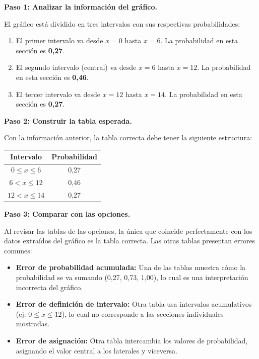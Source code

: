 \documentclass[
]{article}
\providecommand{\tightlist}{%
  \setlength{\itemsep}{0pt}\setlength{\parskip}{0pt}}
\begin{document}
\textbf{Paso 1: Analizar la información del gráfico.}

El gráfico está dividido en tres intervalos con sus respectivas
probabilidades:

\begin{enumerate}
\def\labelenumi{\arabic{enumi}.}
\tightlist
\item
  El primer intervalo va desde \(x=0\) hasta \(x=6\). La probabilidad en
  esta sección es \textbf{0,27}.
\item
  El segundo intervalo (central) va desde \(x=6\) hasta \(x=12\). La
  probabilidad en esta sección es \textbf{0,46}.
\item
  El tercer intervalo va desde \(x=12\) hasta \(x=14\). La probabilidad
  en esta sección es \textbf{0,27}.
\end{enumerate}

\textbf{Paso 2: Construir la tabla esperada.}

Con la información anterior, la tabla correcta debe tener la siguiente
estructura:

\begin{longtable}[]{@{}cc@{}}
\toprule\noalign{}
Intervalo & Probabilidad \\
\midrule\noalign{}
\endhead
\bottomrule\noalign{}
\endlastfoot
\(0 \le x \le 6\) & 0,27 \\
\(6 < x \le 12\) & 0,46 \\
\(12 < x \le 14\) & 0,27 \\
\end{longtable}

\textbf{Paso 3: Comparar con las opciones.}

Al revisar las tablas de las opciones, la única que coincide
perfectamente con los datos extraídos del gráfico es la tabla correcta.
Las otras tablas presentan errores comunes:

\begin{itemize}
\tightlist
\item
  \textbf{Error de probabilidad acumulada:} Una de las tablas muestra
  cómo la probabilidad se va sumando (0,27, 0,73, 1,00), lo cual es una
  interpretación incorrecta del gráfico.
\item
  \textbf{Error de definición de intervalo:} Otra tabla usa intervalos
  acumulativos (ej: \(0 \le x \le 12\)), lo cual no corresponde a las
  secciones individuales mostradas.
\item
  \textbf{Error de asignación:} Otra tabla intercambia los valores de
  probabilidad, asignando el valor central a los laterales y viceversa.
\end{itemize}
\end{document}
